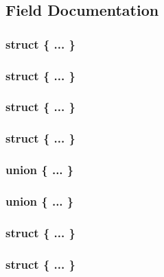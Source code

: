 \subsection{Field Documentation}
\hypertarget{union_____b_d_t_a4658bd43b8fd04c4e613c6942a66a29f}{}\subsubsection[{"@329}]{\setlength{\rightskip}{0pt plus 5cm}struct \{ ... \} }\label{union_____b_d_t_a4658bd43b8fd04c4e613c6942a66a29f}
\hypertarget{union_____b_d_t_ab361181f4f44c972cc349ed437f7a653}{}\subsubsection[{"@331}]{\setlength{\rightskip}{0pt plus 5cm}struct \{ ... \} }\label{union_____b_d_t_ab361181f4f44c972cc349ed437f7a653}
\hypertarget{union_____b_d_t_aa1b49ec9f5ca862911055cb08190d7f4}{}\subsubsection[{"@343}]{\setlength{\rightskip}{0pt plus 5cm}struct \{ ... \} }\label{union_____b_d_t_aa1b49ec9f5ca862911055cb08190d7f4}
\hypertarget{union_____b_d_t_abf2459d132486170fb82e9b833805077}{}\subsubsection[{"@345}]{\setlength{\rightskip}{0pt plus 5cm}struct \{ ... \} }\label{union_____b_d_t_abf2459d132486170fb82e9b833805077}
\hypertarget{union_____b_d_t_a40fb821410fad30feb3efdb773c9744f}{}\subsubsection[{"@357}]{\setlength{\rightskip}{0pt plus 5cm}union \{ ... \} }\label{union_____b_d_t_a40fb821410fad30feb3efdb773c9744f}
\hypertarget{union_____b_d_t_a441935ba0303ff1a5c4e20dc972d9ae3}{}\subsubsection[{"@375}]{\setlength{\rightskip}{0pt plus 5cm}union \{ ... \} }\label{union_____b_d_t_a441935ba0303ff1a5c4e20dc972d9ae3}
\hypertarget{union_____b_d_t_a526aeb08c549a48e8a1cd0038d872578}{}\subsubsection[{"@556}]{\setlength{\rightskip}{0pt plus 5cm}struct \{ ... \} }\label{union_____b_d_t_a526aeb08c549a48e8a1cd0038d872578}
\hypertarget{union_____b_d_t_aa0323a1fc791363908afef4a594c45b5}{}\subsubsection[{"@558}]{\setlength{\rightskip}{0pt plus 5cm}struct \{ ... \} }\label{union_____b_d_t_aa0323a1fc791363908afef4a594c45b5}
\hypertarget{union_____b_d_t_af4319e81938c5bba16d3bdc146991408}{}
